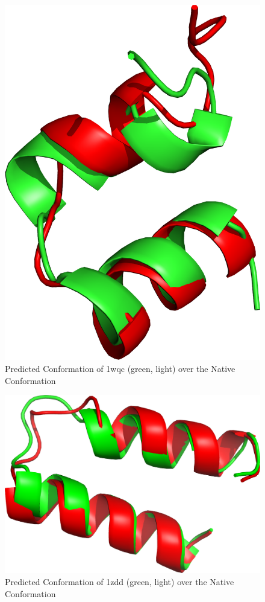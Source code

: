 \begin{figure}[ht]
    \centering
    \includegraphics[width=0.9\linewidth]{Figuras/prots/1wqc_render.png}
    \caption{Predicted Conformation of 1wqc (green, light) over the Native Conformation}
    \label{fig:1wqc-visual}
\end{figure}

\begin{figure}[ht]
    \centering
    \includegraphics[width=0.9\linewidth]{Figuras/prots/1zdd_render.png}
    \caption{Predicted Conformation of 1zdd (green, light) over the Native Conformation}
    \label{fig:1zdd-visual}
\end{figure}

